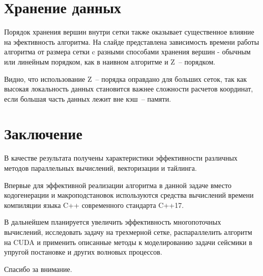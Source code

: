 \documentclass[18pt]{article}
\begin{document}
\section{Хранение данных}
\par
Порядок хранения вершин внутри сетки также оказывает существенное влияние на 
эфективность алгоритма. На слайде представлена зависимость времени 
работы алгоритма от размера сетки c разными способами хранения вершин - 
обычным или линейным порядком, как в наивном алгоритме и Z~-- порядком.

Видно, что использование Z~-- порядка оправдано для больших сеток, так как 
высокая локальность данных становится важнее сложности расчетов координат, 
если большая часть данных лежит вне кэш~-- памяти.

\section{Заключение}
\par
В качестве результата получены характеристики эффективности различных 
методов параллельных вычислений, векторизации и тайлинга.

Впервые для эффективной реализации алгоритма в данной задаче
вместо кодогенерации и макроподстановок используются средства вычислений
времени компиляции языка C++ современного стандарта C++17.

В дальнейшем планируется увеличить эффективность многопоточных вычислений, 
исследовать задачу на трехмерной сетке, распараллелить алгоритм на CUDA 
и применить описанные методы к моделированию задачи сейсмики 
в упругой постановке и других волновых процессов.

Спасибо за внимание.

\end{document}
